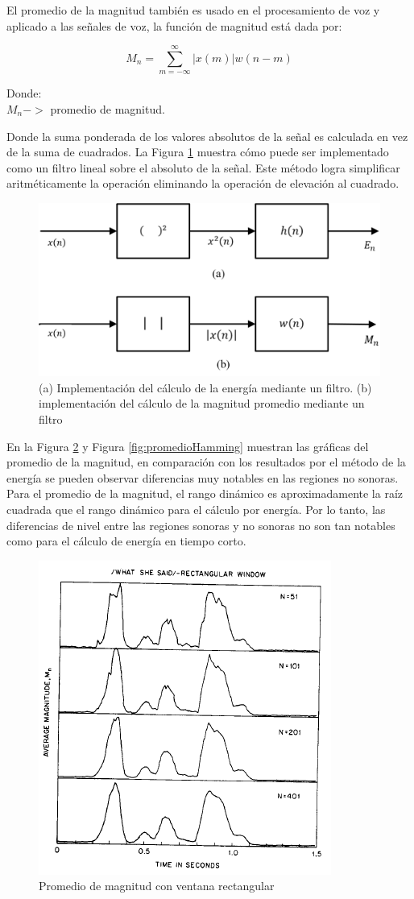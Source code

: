 El promedio de la magnitud también es usado en el procesamiento de voz y aplicado a las señales de voz, la función de magnitud está dada por:

\begin{equation}\label{eq:promedio}
	M_n=\sum_{m=-\infty}^{\infty}{|x(m)|w(n-m)}
\end{equation}

Donde:
\\$M_n->$ promedio de magnitud.

Donde la suma ponderada de los valores absolutos de la señal es calculada en vez de la suma de cuadrados. La Figura \ref{fig:energiaFiltro} muestra cómo puede ser implementado como un filtro lineal sobre el absoluto de la señal. Este método logra simplificar aritméticamente la operación eliminando la operación de elevación al cuadrado.

\begin{figure}[H]
	\centering
	\includegraphics[width=0.5\linewidth]{figures/energiaFiltro}
	\caption{(a) Implementación del cálculo de la energía mediante un filtro. (b) implementación del cálculo de la magnitud promedio mediante un filtro}
	\label{fig:energiaFiltro}
\end{figure}

En la Figura \ref{fig:promedioRectangular} y Figura \ref{fig:promedioHamming} muestran las gráficas del promedio de la magnitud, en comparación con los resultados por el método de la energía se pueden observar diferencias muy notables en las regiones no sonoras. Para el promedio de la magnitud, el rango dinámico es aproximadamente la raíz cuadrada que el rango dinámico para el cálculo por energía. Por lo tanto, las diferencias de nivel entre las regiones sonoras y no sonoras no son tan notables como para el cálculo de energía en tiempo corto.

\begin{figure}[H]
	\centering
	\includegraphics[width=0.5\linewidth]{figures/promedioRectangular}
	\caption{Promedio de magnitud con ventana rectangular}
	\label{fig:promedioRectangular}
\end{figure}

